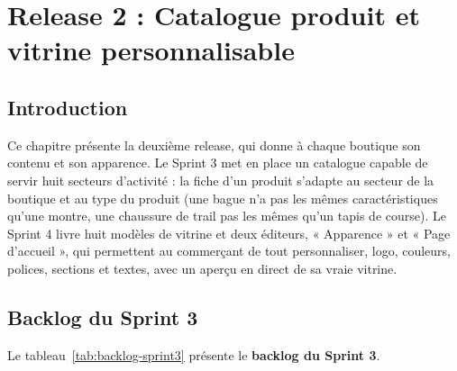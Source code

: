 \thispagestyle{fancy}
\chapter{Release 2 : Catalogue produit et vitrine personnalisable}
\section*{Introduction}
Ce chapitre présente la deuxième release, qui donne à chaque boutique son contenu et son apparence. Le Sprint 3 met en place un catalogue capable de servir huit secteurs d'activité : la fiche d'un produit s'adapte au secteur de la boutique et au type du produit (une bague n'a pas les mêmes caractéristiques qu'une montre, une chaussure de trail pas les mêmes qu'un tapis de course). Le Sprint 4 livre huit modèles de vitrine et deux éditeurs, « Apparence » et « Page d'accueil », qui permettent au commerçant de tout personnaliser, logo, couleurs, polices, sections et textes, avec un aperçu en direct de sa vraie vitrine.

\section{Backlog du Sprint 3}
Le tableau~\ref{tab:backlog-sprint3} présente le \textbf{backlog du Sprint 3}.

